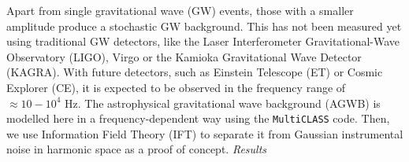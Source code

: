 Apart from single gravitational wave (GW) events, those with a smaller amplitude produce a stochastic GW background. This has not been measured yet using traditional GW detectors, like the Laser Interferometer Gravitational-Wave Observatory (LIGO), Virgo or the Kamioka Gravitational Wave Detector (KAGRA). With future detectors, such as Einstein Telescope (ET) or Cosmic Explorer (CE), it is expected to be observed in the frequency range of $\approx 10-10^4$ Hz.  The astrophysical gravitational wave background (AGWB) is modelled here in a frequency-dependent way using the {\tt MultiCLASS} code. Then, we use Information Field Theory (IFT) to separate it from Gaussian instrumental noise in harmonic space as a proof of concept. 
\textit{Results}